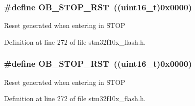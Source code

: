 \subsubsection[{\texorpdfstring{O\+B\+\_\+\+S\+T\+O\+P\+\_\+\+R\+ST}{OB_STOP_RST}}]{\setlength{\rightskip}{0pt plus 5cm}\#define O\+B\+\_\+\+S\+T\+O\+P\+\_\+\+R\+ST~(({\bf uint16\+\_\+t})0x0000)}\hypertarget{group___option___bytes__n_r_s_t___s_t_o_p_gaef92c03b1f279c532bfa13d3bb074b57}{}\label{group___option___bytes__n_r_s_t___s_t_o_p_gaef92c03b1f279c532bfa13d3bb074b57}
Reset generated when entering in S\+T\+OP 

Definition at line 272 of file stm32f10x\+\_\+flash.\+h.

\subsubsection[{\texorpdfstring{O\+B\+\_\+\+S\+T\+O\+P\+\_\+\+R\+ST}{OB_STOP_RST}}]{\setlength{\rightskip}{0pt plus 5cm}\#define O\+B\+\_\+\+S\+T\+O\+P\+\_\+\+R\+ST~(({\bf uint16\+\_\+t})0x0000)}\hypertarget{group___option___bytes__n_r_s_t___s_t_o_p_gaef92c03b1f279c532bfa13d3bb074b57}{}\label{group___option___bytes__n_r_s_t___s_t_o_p_gaef92c03b1f279c532bfa13d3bb074b57}
Reset generated when entering in S\+T\+OP 

Definition at line 272 of file stm32f10x\+\_\+flash.\+h.

